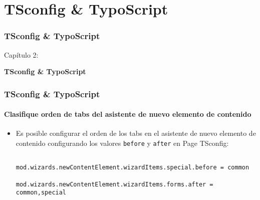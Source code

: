 %

\section{TSconfig \& TypoScript}
\begin{frame}[fragile]
	\frametitle{TSconfig \& TypoScript}

	\begin{center}\huge{Capítulo 2:}\end{center}
	\begin{center}\huge{\color{typo3darkgrey}\textbf{TSconfig \& TypoScript}}\end{center}

\end{frame}

\begin{frame}[fragile]
	\frametitle{TSconfig \& TypoScript}
	\framesubtitle{Clasifique orden de tabs del asistente de nuevo elemento de contenido}

	\lstset{basicstyle=\tiny\ttfamily}

	\begin{itemize}
		\item Es posible configurar el orden de los tabs en el asistente de nuevo elemento de
			contenido configurando los valores \texttt{before} y \texttt{after} en Page TSconfig:

			\begin{lstlisting}
				mod.wizards.newContentElement.wizardItems.special.before = common
				mod.wizards.newContentElement.wizardItems.forms.after = common,special
			\end{lstlisting}

	\end{itemize}

\end{frame}

